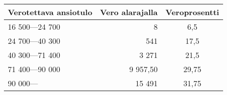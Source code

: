     \centering
    \begin{tabular}{|lrc|}
    \hline
    Verotettava ansiotulo & Vero alarajalla & Veroprosentti \\
    \hline
    16 500—24 700                & 8                             & 6,5                                        \\
    24 700—40 300                & 541                           & 17,5                                       \\
    40 300—71 400                & 3 271                         & 21,5                                       \\
    71 400—90 000                & 9 957,50                      & 29,75                                      \\
    90 000—                      & 15 491                        & 31,75                                     \\
    \hline
    \end{tabular}